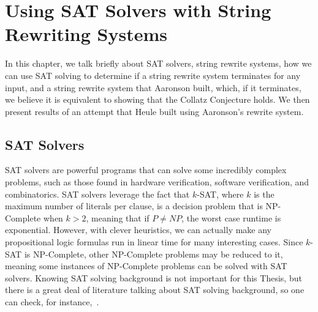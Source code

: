 \chapter{Using SAT Solvers with String Rewriting Systems} \label{sec:SRSandSAT}
In this chapter, we talk briefly about SAT solvers, string rewrite systems, how we can use SAT solving to determine if a string rewrite system terminates for any input, and a string rewrite system that Aaronson built, which, if it terminates, we believe it is equivalent to showing that the Collatz Conjecture holds. We then present results of an attempt that Heule built using Aaronson's rewrite system.
\section{SAT Solvers}
SAT solvers are powerful programs that can solve some incredibly complex problems, such as those found in hardware verification, software verification, and combinatorics. SAT solvers leverage the fact that $k$-SAT, where $k$ is the maximum number of literals per clause, is a decision problem that is NP-Complete when $k > 2$, meaning that if $P \ne NP$, the worst case runtime is exponential. However, with clever heuristics, we can actually make any propositional logic formulas run in linear time for many interesting cases. Since $k$-SAT is NP-Complete, other NP-Complete problems may be reduced to it, meaning some instances of NP-Complete problems can be solved with SAT solvers. Knowing SAT solving background is not important for this Thesis, but there is a great deal of literature talking about SAT solving background, so one can check, for instance,~\cite{Biere:2009:HSV:1550723}.
